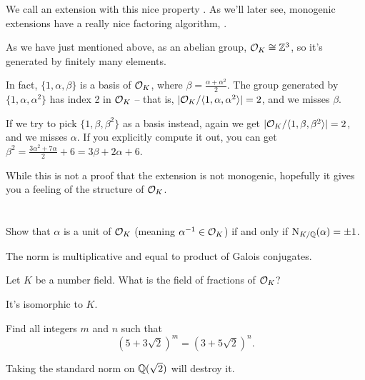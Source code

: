We call an extension with this nice property .
As we'll later see, monogenic extensions have a really nice factoring algorithm,
.

\begin{remark}
	As we have just mentioned above, as an abelian group, $\mathcal O_K \cong \mathbb Z^3$,
	so it's generated by finitely many elements.

	In fact, $\{ 1, \alpha, \beta \}$ is a basis of $\mathcal O_K$,
	where $\beta=\frac{\alpha+\alpha^2}{2}$.
	The group generated by $\{ 1, \alpha, \alpha^2 \}$ has index 2 in $\mathcal O_K$ --
	that is, $|\mathcal O_K/\langle 1, \alpha, \alpha^2\rangle|=2$, and we misses
	$\beta$.

	If we try to pick $\{ 1, \beta, \beta^2 \}$ as a basis instead, again we
	get $|\mathcal O_K/\langle 1, \beta, \beta^2\rangle|=2$, and we misses $\alpha$.
	If you explicitly compute it out, you can get
	$\beta^2 = \frac{3\alpha^2 + 7\alpha}{2} + 6 = 3 \beta+2 \alpha+6$.

	While this is not a proof that the extension is not monogenic, hopefully it
	gives you a feeling of the structure of $\mathcal O_K$.

\end{remark}

\section{\problemhead}

\begin{sproblem} %
	\label{prob:OK_unit_norm}
	Show that $\alpha$ is a unit of $\mathcal O_K$ (meaning $\alpha^{-1} \in \mathcal O_K$)
	if and only if $\operatorname{N}_{K/\mathbb Q}(\alpha) = \pm 1$.
	\begin{hint}
		The norm is multiplicative and equal to product of Galois conjugates.
	\end{hint}
\end{sproblem}

\begin{sproblem}
	Let $K$ be a number field.
	What is the field of fractions of $\mathcal O_K$?
	\begin{hint}
		It's isomorphic to $K$.
	\end{hint}
\end{sproblem}

\begin{problem}
	Find all integers $m$ and $n$ such that
	\[ \left( 5+3\sqrt2 \right)^m = \left( 3+5\sqrt2 \right)^n. \]
	\begin{hint}
		Taking the standard norm on $\mathbb Q(\sqrt2)$ will destroy it.
	\end{hint}
\end{problem}


